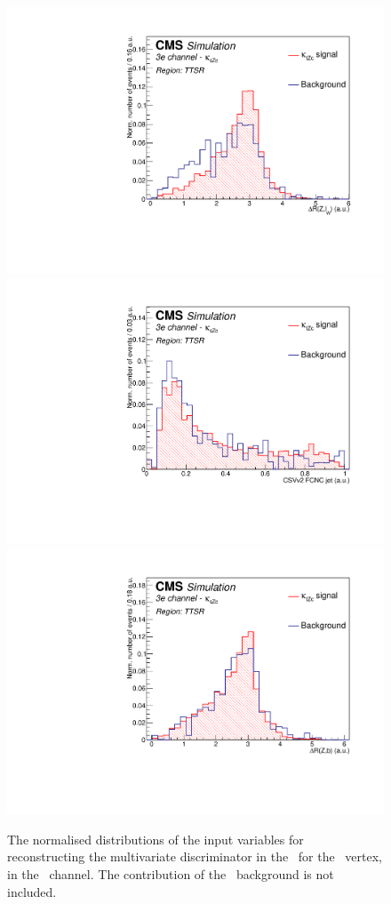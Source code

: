 \begin{figure}[htbp]
\includegraphics[width=0.25\linewidth]{6_Search/Figures/PlotsTechnics/dRZWlepZcttoppaireee_norm}
\includegraphics[width=0.25\linewidth]{6_Search/Figures/PlotsTechnics/Bdis_LightjetZcttoppaireee_norm}
\includegraphics[width=0.25\linewidth]{6_Search/Figures/PlotsTechnics/dRZbZcttoppaireee_norm}
\caption{The normalised distributions of the input variables for reconstructing the multivariate discriminator in the \TTSR\ for the \Zct\ vertex, in the \eee\ channel.  The contribution of the \NPL\ background is not included.}
\label{fig:toppairZctnormalizedeee}
\end{figure}

\clearpage
